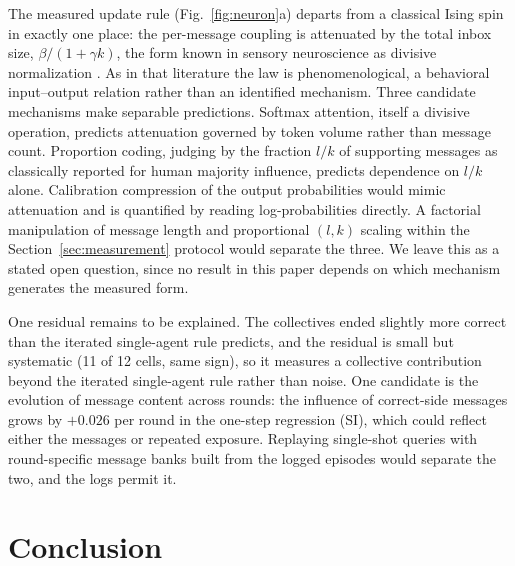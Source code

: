 \documentclass[11pt]{article}
\begin{document}
The measured update rule (Fig.~\ref{fig:neuron}a) departs from a classical
Ising spin in exactly one place: the per-message coupling is attenuated by
the total inbox size, $\beta/(1+\gamma k)$, the form known in sensory
neuroscience as divisive normalization \citep{CarandiniHeeger2012}. As in
that literature the law is phenomenological, a behavioral input--output
relation rather than an identified mechanism. Three candidate mechanisms
make separable predictions. Softmax attention, itself a divisive operation,
predicts attenuation governed by token volume rather than message count.
Proportion coding, judging by the fraction $l/k$ of supporting messages as
classically reported for human majority influence, predicts dependence on
$l/k$ alone. Calibration compression of the output probabilities would mimic
attenuation and is quantified by reading log-probabilities directly. A
factorial manipulation of message length and proportional $(l, k)$ scaling
within the Section~\ref{sec:measurement} protocol would separate the three.
We leave this as a stated open question, since no result in this paper
depends on which mechanism generates the measured form.

One residual remains to be explained. The collectives ended slightly more
correct than the iterated single-agent rule predicts, and the residual is
small but systematic (11 of 12 cells, same sign), so it measures a
collective contribution beyond the iterated single-agent rule rather than
noise. One candidate is the evolution of message content across rounds: the
influence of correct-side messages grows by $+0.026$ per round in the
one-step regression (SI), which could reflect either the messages or
repeated exposure. Replaying single-shot queries with round-specific
message banks built from the logged episodes would separate the two, and
the logs permit it.

\section*{Conclusion}
\end{document}
